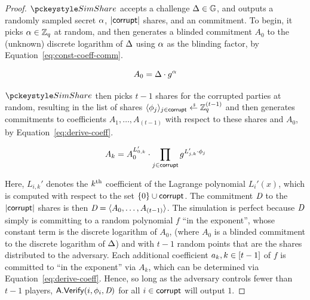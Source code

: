 \begin{proof}
  $\simshare$ accepts a challenge $\Delta \in \mathbb{G}$,
  and outputs a randomly sampled secret $\alpha$,
  $\lvert \mathsf{corrupt} \rvert$ shares,
  and an \AVSS commitment.
  To begin, it picks $\alpha \in \mathbb{Z}_q$ at random,
  and then generates a blinded commitment $A_0$ to the (unknown) discrete logarithm of $\Delta$ using $\alpha$ as the blinding factor, by Equation~\ref{eq:const-coeff-comm}.

  \begin{equation} \label{eq:const-coeff-comm}
    A_0 = \Delta \cdot g^{\alpha}
  \end{equation}

  $\simshare$ then picks $t-1$ shares for the corrupted parties at random,
  resulting in the list of shares $\langle\share_j\rangle_{j \in \corrupt} \rgets \Zq^{(t-1)}$ and then generates commitments to coefficients
  $A_1, \ldots, A_{(t-1)}$ with respect to these shares and $A_0$, by Equation~\ref{eq:derive-coeff}.

  \begin{equation} \label{eq:derive-coeff}
    A_k = A_0^{L'_{0,k}} \cdot \prod_{j \in \mathsf{corrupt}} g^{L'_{j,k} \cdot \phi_j}
  \end{equation}


  Here, $L_{i,k}'$ denotes the $k^{\textrm{\scriptsize th}}$ coefficient of the Lagrange polynomial $L_i'(x)$,
  which is computed with respect to the set $\{0\} \cup \mathsf{corrupt}$.
  The commitment $\textit{D}$ to the $\lvert \mathsf{corrupt} \rvert$ shares is then $\textit{D} = \langle A_0, \ldots, A_{(t-1)} \rangle$.
  The simulation is perfect because $\textit{D}$ simply is committing to a random polynomial $f$ ``in the exponent'',
  whose constant term is the discrete logarithm of $A_0$,
  (where  $A_0$ is a blinded commitment to the discrete logarithm of $\Delta$)
  and with $t-1$ random points that are the shares distributed to the adversary.
  Each additional coefficient $a_k,  k \in [t-1]$ of $f$ is committed to ``in the exponent'' via $A_k$,
  which can be determined via Equation~\ref{eq:derive-coeff}.
  Hence, so long as the adversary controls fewer than $t-1$ players,
  $\mathsf{A}.\mathsf{Verify}(i, \phi_i, \textit{D})$ for all $i \in \mathsf{corrupt}$ will output $1$.
\end{proof}

